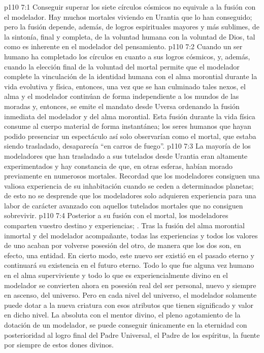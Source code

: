 \vs p110 7:1 Conseguir superar los siete círculos cósmicos no equivale a la fusión con el modelador. Hay muchos mortales viviendo en Urantia que lo han conseguido; pero la fusión depende, además, de logros espirituales mayores y más sublimes, de la sintonía, final y completa, de la voluntad humana con la voluntad de Dios, tal como es inherente en el modelador del pensamiento.
\vs p110 7:2 Cuando un ser humano ha completado los círculos en cuanto a sus logros cósmicos, y, además, cuando la elección final de la voluntad del mortal permite que el modelador complete la vinculación de la identidad humana con el alma morontial durante la vida evolutiva y física, entonces, una vez que se han culminado tales nexos, el alma y el modelador continúan de forma independiente a los mundos de las moradas y, entonces, se emite el mandato desde Uversa ordenando la fusión inmediata del modelador y del alma morontial. Esta fusión durante la vida física consume al cuerpo material de forma instantánea; los seres humanos que hayan podido presenciar un espectáculo así solo observarían como el mortal, que estaba siendo trasladado, desaparecía “en carros de fuego”.
\vs p110 7:3 La mayoría de los modeladores que han trasladado a sus tutelados desde Urantia eran altamente experimentados y hay constancia de que, en otras esferas, habían morado previamente en numerosos mortales. Recordad que los modeladores consiguen una valiosa experiencia de su inhabitación cuando se ceden a determinados planetas; de esto no se desprende que los modeladores solo adquieren experiencia para una labor de carácter avanzado con aquellos tutelados mortales que no consiguen sobrevivir.
\vs p110 7:4 \pc Posterior a su fusión con el mortal, los modeladores comparten vuestro destino y experiencias; . Tras la fusión del alma morontial inmortal y del modelador acompañante, todas las experiencias y todos los valores de uno acaban por volverse posesión del otro, de manera que los dos son, en efecto, una entidad. En cierto modo, este nuevo ser existió en el pasado eterno y continuará su existencia en el futuro eterno. Todo lo que fue alguna vez humano en el alma superviviente y todo lo que es experiencialmente divino en el modelador se convierten ahora en posesión real del ser personal, nuevo y siempre en ascenso, del universo. Pero en cada nivel del universo, el modelador solamente puede dotar a la nueva criatura con esos atributos que tienen significado y valor en dicho nivel. La  absoluta con el mentor divino, el pleno agotamiento de la dotación de un modelador, se puede conseguir únicamente en la eternidad con posterioridad al logro final del Padre Universal, el Padre de los espíritus, la fuente por siempre de estos dones divinos.
